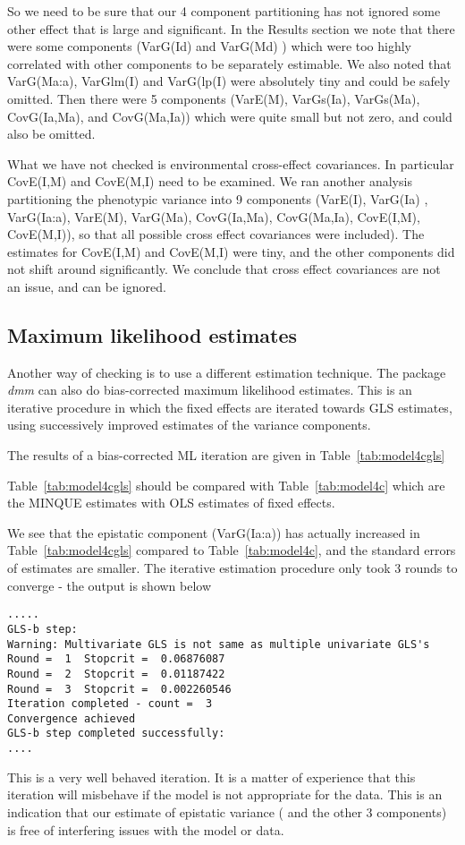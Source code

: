 \documentclass[titlepage]{article}  %
\begin{document}
So we need to be sure that our 4 component partitioning has not ignored some other effect that is large and significant. In the Results section we note that  there were some components (VarG(Id) and VarG(Md) ) which were too highly correlated with other components to be separately estimable. We also noted that VarG(Ma:a), VarGlm(I) and VarG(lp(I) were absolutely tiny and could be safely omitted. Then there were 5 components (VarE(M), VarGs(Ia), VarGs(Ma), CovG(Ia,Ma), and CovG(Ma,Ia))  which were quite small but not zero, and could also be omitted.

What we have not checked is environmental cross-effect covariances. In particular CovE(I,M) and CovE(M,I) need to be examined. We ran another analysis partitioning the phenotypic variance into 9 components (VarE(I), VarG(Ia) , VarG(Ia:a), VarE(M), VarG(Ma), CovG(Ia,Ma), CovG(Ma,Ia), CovE(I,M), CovE(M,I)), so that all possible cross effect covariances were included). The estimates for CovE(I,M) and CovE(M,I) were tiny, and the other components did not shift around significantly. We conclude that cross effect covariances are not an issue, and can be ignored.

\subsection{Maximum likelihood estimates}
Another way of checking is to use a different estimation technique. The package {\em dmm} can also do bias-corrected maximum likelihood estimates. This is an iterative procedure in which the fixed effects are iterated towards GLS estimates, using successively improved estimates of the variance components. 

The results of a bias-corrected ML iteration are given in Table~\ref{tab:model4cgls}

Table~\ref{tab:model4cgls} should be compared with Table~\ref{tab:model4c} which are the MINQUE estimates with OLS estimates of fixed effects. 

We see that the epistatic component (VarG(Ia:a)) has actually increased in Table~\ref{tab:model4cgls} compared to Table~\ref{tab:model4c}, and the standard errors of estimates are smaller. The iterative estimation procedure only took 3 rounds to converge - the output is shown below
\begin{verbatim}
.....
GLS-b step:
Warning: Multivariate GLS is not same as multiple univariate GLS's
Round =  1  Stopcrit =  0.06876087 
Round =  2  Stopcrit =  0.01187422 
Round =  3  Stopcrit =  0.002260546 
Iteration completed - count =  3 
Convergence achieved
GLS-b step completed successfully:
....
\end{verbatim}
This is a very well behaved iteration. It is a matter of experience that this iteration will misbehave if the model is not appropriate for the data. This is an indication that our estimate of epistatic variance ( and the other 3 components) is free of interfering issues with the model or data.
\end{document}
